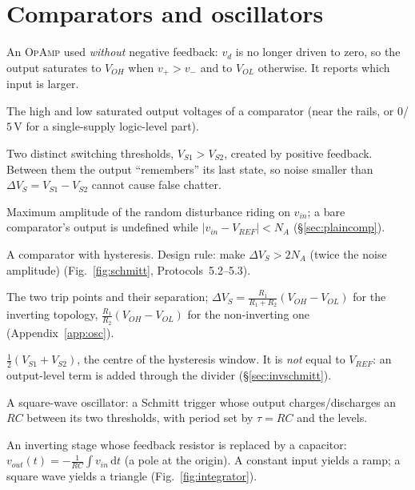 \documentclass[11pt,a4paper,oneside]{book}
\newcommand{\vd}{v_d}
\newcommand{\op}{\textsc{OpAmp}}
\begin{document}
\section{Comparators and oscillators}
\begin{description}[style=unboxed,leftmargin=0pt,itemsep=5pt,parsep=0pt,
        font=\normalfont\bfseries\color{accent!85!black}]
\item[Comparator.] An \op{} used \emph{without} negative feedback: $\vd$ is no longer
  driven to zero, so the output saturates to $V_{OH}$ when $v_+>v_-$ and to $V_{OL}$
  otherwise. It reports which input is larger.
\item[Output levels $V_{OH},V_{OL}$.] The high and low saturated output voltages of a
  comparator (near the rails, or $0$/$5$\,V for a single-supply logic-level part).
\item[Hysteresis.] Two distinct switching thresholds, $V_{S1}>V_{S2}$, created by
  positive feedback. Between them the output ``remembers'' its last state, so noise
  smaller than $\Delta V_S=V_{S1}-V_{S2}$ cannot cause false chatter.
\item[Noise amplitude $N_A$.] Maximum amplitude of the random disturbance riding on
  $v_{in}$; a bare comparator's output is undefined while
  $|v_{in}-V_{REF}|<N_A$ (\S\ref{sec:plaincomp}).
\item[Schmitt trigger.] A comparator with hysteresis. Design rule: make
  $\Delta V_S>2N_A$ (twice the noise amplitude) (Fig.~\ref{fig:schmitt},
  Protocols~5.2--5.3).
\item[Threshold voltages $V_{S1},V_{S2}$ and width $\Delta V_S$.] The two trip points
  and their separation; $\Delta V_S=\frac{R_1}{R_1+R_2}(V_{OH}-V_{OL})$ for the
  inverting topology, $\frac{R_1}{R_2}(V_{OH}-V_{OL})$ for the non-inverting one
  (Appendix~\ref{app:osc}).
\item[Hysteresis mean $V_{S,avg}$.] $\tfrac12(V_{S1}+V_{S2})$, the centre of the
  hysteresis window. It is \emph{not} equal to $V_{REF}$: an output-level term is
  added through the divider (\S\ref{sec:invschmitt}).
\item[Astable multivibrator.] A square-wave oscillator: a Schmitt trigger whose
  output charges/discharges an $RC$ between its two thresholds, with period set by
  $\tau=RC$ and the levels.
\item[Integrator.] An inverting stage whose feedback resistor is replaced by a
  capacitor: $v_{out}(t)=-\frac1{RC}\int v_{in}\,\mathrm{d}t$ (a pole at the origin).
  A constant input yields a ramp; a square wave yields a triangle (Fig.~\ref{fig:integrator}).
\end{description}
\end{document}
